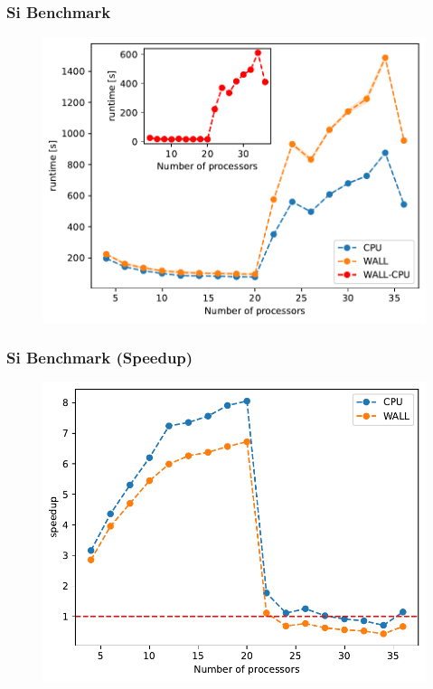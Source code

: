 \documentclass{beamer}
\begin{document}
\begin{frame}
    \frametitle{Si Benchmark}
    \begin{figure}
        \includegraphics[width=\linewidth, height=\textheight,keepaspectratio]{si_bench_nprocs.pdf}
    \end{figure}
\end{frame}

\begin{frame}
    \frametitle{Si Benchmark (Speedup)}
    \begin{figure}
        \includegraphics[width=\linewidth, height=\textheight,keepaspectratio]{si_bench_nprocs_speedup.pdf}
    \end{figure}
\end{frame}
\end{document}
